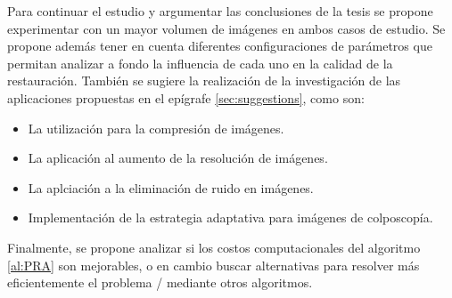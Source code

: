 \begin{recomendations}\label{chapter:Recomendations}

Para continuar el estudio y argumentar las conclusiones de la tesis se propone experimentar con un mayor volumen de im\'agenes en ambos casos de estudio. Se propone además tener en cuenta diferentes configuraciones de parámetros que permitan analizar a fondo la influencia de cada uno en la calidad de la restauraci\'on. Tambi\'en se sugiere la realizaci\'on de la investigaci\'on de las aplicaciones propuestas en el epígrafe \ref{sec:suggestions}, como son:
\begin{itemize}
	\item La utilizaci\'on para la compresi\'on de im\'agenes.
	\item La aplicaci\'on al aumento de la resoluci\'on de im\'agenes.
	\item La aplciaci\'on a la eliminaci\'on de ruido en im\'agenes.
	\item Implementaci\'on de la estrategia adaptativa para im\'agenes de colposcop\'ia.
\end{itemize}
Finalmente, se propone analizar si los costos computacionales del algoritmo \ref{al:PRA} son mejorables, o en cambio buscar alternativas para resolver m\'as eficientemente el problema \TSP/ mediante otros algoritmos. 

\end{recomendations}
